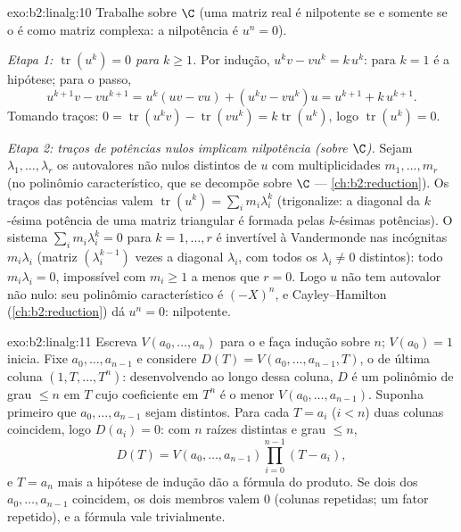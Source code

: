\begin{solution}{exo:b2:linalg:10}
Trabalhe sobre $\C$ (uma matriz real é nilpotente se e somente se o é como matriz
complexa: a nilpotência é $u^n = 0$).

\emph{Etapa 1: $\operatorname{tr}(u^k) = 0$ para $k \geq 1$.} Por
indução, $u^k v - v u^k = k\, u^k$: para $k = 1$ é a
hipótese; para o passo,
\[
u^{k+1}v - vu^{k+1} = u^k(uv - vu) + (u^k v - v u^k)u
= u^{k+1} + k\,u^{k+1} .
\]
Tomando traços: $0 = \operatorname{tr}(u^k v) -
\operatorname{tr}(vu^k) = k \operatorname{tr}(u^k)$, logo
$\operatorname{tr}(u^k) = 0$.

\emph{Etapa 2: traços de potências nulos implicam nilpotência (sobre $\C$).} Sejam
$\lambda_1, \dots, \lambda_r$ os autovalores não nulos distintos de
$u$ com multiplicidades $m_1, \dots, m_r$ (no polinômio
característico, que se decompõe sobre $\C$ ---
\cref{ch:b2:reduction}). Os traços das potências valem $\operatorname{tr}(u^k) =
\sum_i m_i \lambda_i^k$ (trigonalize: a diagonal da $k$-ésima potência de uma
matriz triangular é formada pelas $k$-ésimas potências). O sistema $\sum_i m_i
\lambda_i^k = 0$ para $k = 1, \dots, r$ é invertível à Vandermonde nas
incógnitas $m_i\lambda_i$ (matriz $(\lambda_i^{k-1})$ vezes
a diagonal $\lambda_i$, com todos os $\lambda_i \neq 0$ distintos): todo $m_i
\lambda_i = 0$, impossível com $m_i \geq 1$ a menos que $r = 0$. Logo $u$
não tem autovalor não nulo: seu polinômio característico é
$(-X)^n$, e Cayley--Hamilton (\cref{ch:b2:reduction}) dá $u^n
= 0$: nilpotente.
\end{solution}

\begin{solution}{exo:b2:linalg:11}
Escreva $V(a_0, \dots, a_n)$ para o  e faça indução sobre $n$;
$V(a_0) = 1$ inicia. Fixe $a_0, \dots, a_{n-1}$ e considere $D(T) =
V(a_0, \dots, a_{n-1}, T)$, o  de última coluna $(1,
T, \dots, T^n)$: desenvolvendo ao longo dessa coluna, $D$ é um polinômio
de grau $\leq n$ em $T$ cujo coeficiente em $T^n$ é o menor
$V(a_0, \dots, a_{n-1})$. Suponha primeiro que $a_0, \dots,
a_{n-1}$ sejam distintos. Para cada $T = a_i$ ($i < n$) duas colunas
coincidem, logo $D(a_i) = 0$: com $n$ raízes distintas e grau
$\leq n$,
\[
D(T) = V(a_0, \dots, a_{n-1}) \prod_{i=0}^{n-1}(T - a_i),
\]
e $T = a_n$ mais a hipótese de indução dão a fórmula do
produto. Se dois dos $a_0, \dots, a_{n-1}$ coincidem, os dois membros valem
$0$ (colunas repetidas; um fator repetido), e a fórmula vale
trivialmente.
\end{solution}

